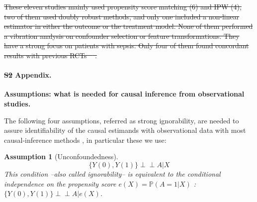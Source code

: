 \documentclass[10pt,letterpaper]{article}
\newcommand{\indep}{\perp \!\!\! \perp}
\newtheorem{assumption}{Assumption}
\providecommand{\DIFaddtex}[1]{{\protect\color{blue}\uwave{#1}}} %
\providecommand{\DIFdeltex}[1]{{\protect\color{red}\sout{#1}}}                      %
\providecommand{\DIFaddbegin}{} %
\providecommand{\DIFaddend}{} %
\providecommand{\DIFdelbegin}{} %
\providecommand{\DIFdelend}{} %
\providecommand{\DIFadd}[1]{\texorpdfstring{\DIFaddtex{#1}}{#1}} %
\providecommand{\DIFdel}[1]{\texorpdfstring{\DIFdeltex{#1}}{}} %
\newcommand{\DIFscaledelfig}{0.5}
\newlength{\DIFdelgraphicswidth} %
\newlength{\DIFdelgraphicsheight} %
\newcommand{\DIFaddincludegraphics}[2][]{{\color{blue}\fbox{\DIFOincludegraphics[#1]{#2}}}} %
\newcommand{\DIFdelincludegraphics}[2][]{%
\sbox{\DIFdelgraphicsbox}{\DIFOincludegraphics[#1]{#2}}%
\settoboxwidth{\DIFdelgraphicswidth}{\DIFdelgraphicsbox} %
\settoboxtotalheight{\DIFdelgraphicsheight}{\DIFdelgraphicsbox} %
\scalebox{\DIFscaledelfig}{%
\parbox[b]{\DIFdelgraphicswidth}{\usebox{\DIFdelgraphicsbox}\\[-\baselineskip] \rule{\DIFdelgraphicswidth}{0em}}\llap{\resizebox{\DIFdelgraphicswidth}{\DIFdelgraphicsheight}{%
\setlength{\unitlength}{\DIFdelgraphicswidth}%
\begin{picture}(1,1)%
\thicklines\linethickness{2pt} %
{\color[rgb]{1,0,0}\put(0,0){\framebox(1,1){}}}%
{\color[rgb]{1,0,0}\put(0,0){\line( 1,1){1}}}%
{\color[rgb]{1,0,0}\put(0,1){\line(1,-1){1}}}%
\end{picture}%
}\hspace*{3pt}}} %
} %
\DeclareRobustCommand{\DIFaddbegin}{\DIFOaddbegin \let\includegraphics\DIFaddincludegraphics} %
\DeclareRobustCommand{\DIFaddend}{\DIFOaddend \let\includegraphics\DIFOincludegraphics} %
\DeclareRobustCommand{\DIFdelbegin}{\DIFOdelbegin \let\includegraphics\DIFdelincludegraphics} %
\DeclareRobustCommand{\DIFdelend}{\DIFOaddend \let\includegraphics\DIFOincludegraphics} %
\begin{document}
\DIFdelbegin \DIFdel{These eleven studies mainly used propensity score matching (6) and IPW (4), two of
them used doubly robust methods, and only one included a non-linear estimator in
either the outcome or the treatment model. None of them performed a vibration
analysis on confounder selection or feature transformations. They have a
strong focus on patients with sepsis. Only four of them found concordant results with
previous RCTs \mbox{%
\cite{liu2021effects,shahn2020fluid,adibuzzaman2019323}}\hskip0pt%
.
}%
\DIFdelend %


\paragraph*{\DIFdelbegin \DIFdel{S2 }\DIFdelend \DIFaddbegin \DIFadd{S1 }\DIFaddend Appendix.}
\label{apd:causal_assumptions}
{\bf Assumptions: what is needed for causal inference from observational studies.}


The following four assumptions, referred as strong ignorability, are
needed to assure identifiability of the causal estimands with observational
data with most causal-inference methods \cite{rubin2005causal}, in
particular these we use:

\begin{assumption}[Unconfoundedness]\label{assumption:ignorability}
  \begin{equation}\label{eq:ignorability}
    \{Y(0), Y(1) \} \indep A | X
  \end{equation}
  This condition --also called ignorability-- is equivalent to the conditional
  independence on the propensity score $e(X)=\mathbb P(A=1|X)$ \cite{rosenbaum1983central}: $\{Y(0), Y(1) \}\indep  A | e(X)$.
\end{assumption}
\end{document}
